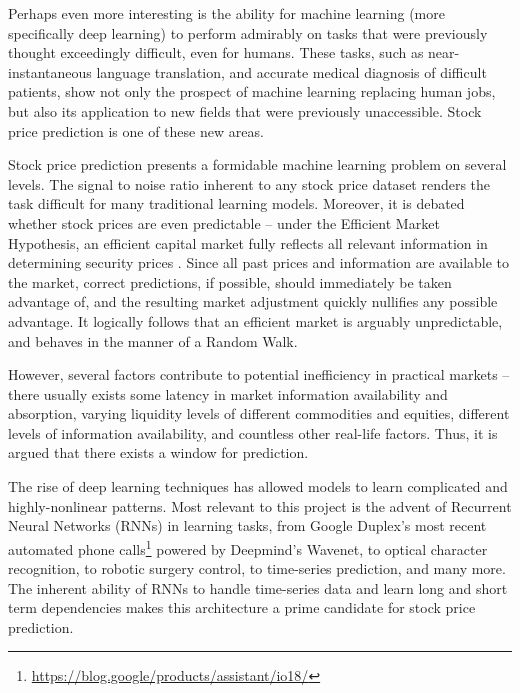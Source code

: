 \documentclass[12pt,a4paper,twoside,openright]{report}
\begin{document}
Perhaps even more interesting is the ability for machine learning (more specifically
deep learning) to perform
admirably on tasks that were previously thought exceedingly difficult,
even for humans. These tasks, such as near-instantaneous language translation\cite{Sutskever14}, and
accurate medical diagnosis of difficult patients\cite{Litjens17, Lee17}, show not only the prospect of machine learning
replacing human jobs, but also its application to new fields that were previously
unaccessible. Stock price prediction is one of these new areas.

Stock price prediction presents a formidable machine learning problem on several levels.
The signal to noise ratio inherent to any stock price dataset renders the task difficult
for many traditional learning models. Moreover, it is debated whether stock prices are
even predictable -- under the Efficient Market Hypothesis, an efficient capital market fully reflects
all relevant information in determining security prices \cite{Malkiel89}. Since all past prices and
information are available to the market, correct predictions, if possible, should immediately be
taken advantage of, and the resulting market adjustment quickly nullifies any possible advantage.
It logically follows that an efficient market is arguably unpredictable, and behaves in the manner of a Random Walk.

However, several factors contribute to potential inefficiency in practical markets --
there usually exists some latency in market information availability and absorption, varying liquidity levels
of different commodities and equities, different levels of information availability, and countless other
real-life factors. Thus, it is argued that there exists a window for prediction\cite{Buffett10, Chan03, Basu77}.

The rise of deep learning techniques has allowed models to learn complicated and highly-nonlinear 
patterns. Most relevant to this project is the advent of Recurrent Neural Networks (RNNs) in learning tasks, from
Google Duplex's most recent automated phone calls\footnote{\url{https://blog.google/products/assistant/io18/}}
powered by Deepmind's Wavenet\cite{Oord16}, to optical character recognition\cite{Breuel13}, to
robotic surgery control\cite{Mayer08}, to time-series prediction\cite{Malhotra15, Lipton15}, and many more.
The inherent ability of RNNs to handle time-series data and learn long and short term dependencies makes
this architecture a prime candidate for stock price prediction.
\end{document}
